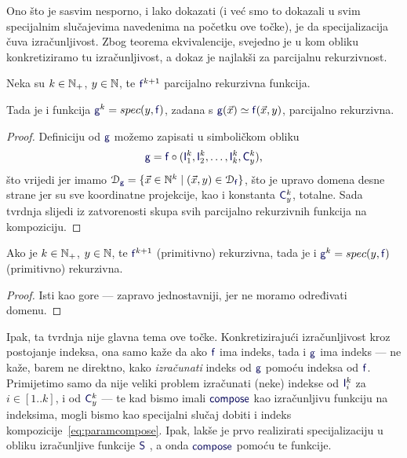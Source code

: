 Ono što je sasvim nesporno, i lako dokazati (i već smo to dokazali u svim specijalnim slučajevima navedenima na početku ove točke), je da specijalizacija čuva izračunljivost. Zbog teorema ekvivalencije, svejedno je u kom obliku konkretiziramo tu izračunljivost, a dokaz je najlakši za parcijalnu rekurzivnost.

\begin{propozicija}
    Neka su $k\in{\mathbb N}_+$, $y\in{\mathbb N}$, te $\f f^{k+1}$ parcijalno rekurzivna funkcija.

    Tada je i funkcija $\f g^k=spec(y,\f f)$, zadana s
    $\f g(\vec x)\simeq\f f(\vec x,y)$,
parcijalno rekurzivna.
\end{propozicija}
\begin{proof}
Definiciju od $\f g$ možemo zapisati u simboličkom obliku
\begin{equation}\label{eq:paramcompose}
    \f g=\f f\circ(\f I_1^k,\f I_2^k,\dotsc,\f I_k^k,\f C_y^k)\text,
\end{equation}
što vrijedi jer imamo $\dom{\f g}=\{\vec x\in\N^k\mid(\vec x,y)\in\dom{\f f}\}$, što je upravo domena desne strane jer su sve koordinatne projekcije, kao i konstanta $\f C_y^k$, totalne. Sada tvrdnja slijedi iz zatvorenosti skupa svih parcijalno rekurzivnih funkcija na kompoziciju.
\end{proof}

\begin{korolar}\label{kor:paramprn}
    Ako je $k\in{\mathbb N}_+$, $y\in{\mathbb N}$, te $\f f^{k+1}$ (primitivno) rekurzivna, tada je i $\f g^k=spec(y,\f f)$ (primitivno) rekurzivna.
\end{korolar}
\begin{proof}
Isti kao gore --- zapravo jednostavniji, jer ne moramo određivati domenu.
\end{proof}

Ipak, ta tvrdnja nije glavna tema ove točke. Konkretizirajući izračunljivost kroz postojanje indeksa, ona samo kaže da ako $\f f$ ima indeks, tada i $\f g$ ima indeks --- ne kaže, barem ne direktno, kako \emph{izračunati} indeks od $\f g$ pomoću indeksa od $\f f$. Primijetimo samo da nije veliki problem izračunati (neke) indekse od $\f I_i^k$ za $i\in[1..k]$, i od $\f C_y^k$ --- te kad bismo imali $\f{compose}$ kao izračunljivu funkciju na indeksima, mogli bismo kao specijalni slučaj dobiti i indeks kompozicije~\eqref{eq:paramcompose}. Ipak, lakše je prvo realizirati specijalizaciju u obliku izračunljive funkcije $\f S$%
, a onda $\f{compose}$ pomoću te funkcije.

